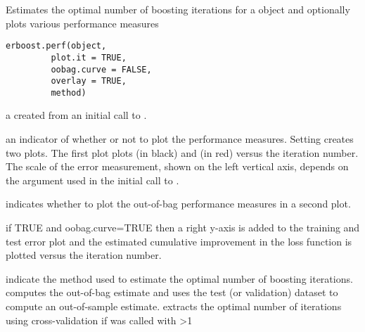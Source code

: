 \documentclass[a4paper]{book}
\begin{document}
%
\begin{SeeAlso}\relax
{}
\end{SeeAlso}
%
\begin{Description}\relax
Estimates the optimal number of boosting iterations for a  object and
optionally plots various performance measures
\end{Description}
%
\begin{Usage}
\begin{verbatim}
erboost.perf(object, 
         plot.it = TRUE, 
         oobag.curve = FALSE, 
         overlay = TRUE, 
         method)
\end{verbatim}
\end{Usage}
%
\begin{Arguments}
\begin{ldescription}
\item[\code{object}] a  created from an initial call to 
.
\item[\code{plot.it}] an indicator of whether or not to plot the performance measures.
Setting  creates two plots. The first plot plots 
 (in black) and  (in red) 
versus the iteration number. The scale of the error measurement, shown on the 
left vertical axis, depends on the  argument used in the 
initial call to .
\item[\code{oobag.curve}] indicates whether to plot the out-of-bag performance measures
in a second plot.
\item[\code{overlay}] if TRUE and oobag.curve=TRUE then a right y-axis is added to the 
training and test error plot and the estimated cumulative improvement in the loss 
function is plotted versus the iteration number.
\item[\code{method}] indicate the method used to estimate the optimal number
of boosting iterations.  computes the out-of-bag
estimate and  uses the test (or validation) dataset 
to compute an out-of-sample estimate.  extracts the 
optimal number of iterations using cross-validation if  was called
with >1
\end{ldescription}
\end{Arguments}
\end{document}
